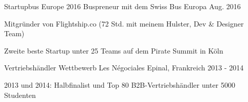 

\begin{cventries}

  \cventry
    {Startupbus Europe 2016} %
    {Buspreneur mit dem Swiss Bus} %
    {Europa} %
    {Aug. 2016} %
    {
      \begin{cvitems} %
        \item {Mitgründer von Flightship.co (72 Std. mit meinem Hulster, Dev \& Designer Team)}
        \item {Zweite beste Startup unter 25 Teams auf dem Pirate Summit in Köln}
      \end{cvitems}
    }

  \cventry
    {Vertriebshändler Wettbewerb} %
    {Les Négociales} %
    {Epinal, Frankreich} %
    {2013 - 2014} %
    {
    	\begin{cvitems}
    	\item{2013 und 2014: Halbfinalist und Top 80 B2B-Vertriebshändler unter 5000 Studenten}
    	\end{cvitems}
    }
\end{cventries}

